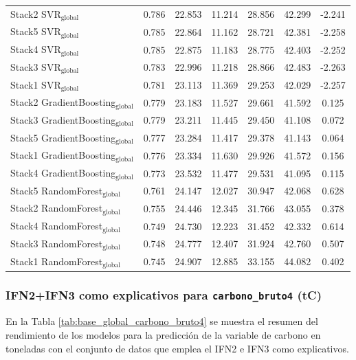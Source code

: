 \begin{table}
{\begin{tabular}{p{4.5cm}cccccc}
    Stack2 SVR$_{\text{global}}$ & 0.786 & 22.853 & 11.214 & 28.856 & 42.299 & -2.241 \\
    Stack5 SVR$_{\text{global}}$ & 0.785 & 22.864 & 11.162 & 28.721 & 42.381 & -2.258 \\
    Stack4 SVR$_{\text{global}}$ & 0.785 & 22.875 & 11.183 & 28.775 & 42.403 & -2.252 \\
    Stack3 SVR$_{\text{global}}$ & 0.783 & 22.996 & 11.218 & 28.866 & 42.483 & -2.263 \\
    Stack1 SVR$_{\text{global}}$ & 0.781 & 23.113 & 11.369 & 29.253 & 42.029 & -2.257 \\
    Stack2 GradientBoosting$_{\text{global}}$ & 0.779 & 23.183 & 11.527 & 29.661 & 41.592 & 0.125 \\
    Stack3 GradientBoosting$_{\text{global}}$ & 0.779 & 23.211 & 11.445 & 29.450 & 41.108 & 0.072 \\
    Stack5 GradientBoosting$_{\text{global}}$ & 0.777 & 23.284 & 11.417 & 29.378 & 41.143 & 0.064 \\
    Stack1 GradientBoosting$_{\text{global}}$ & 0.776 & 23.334 & 11.630 & 29.926 & 41.572 & 0.156 \\
    Stack4 GradientBoosting$_{\text{global}}$ & 0.773 & 23.532 & 11.477 & 29.531 & 41.095 & 0.115 \\
    Stack5 RandomForest$_{\text{global}}$ & 0.761 & 24.147 & 12.027 & 30.947 & 42.068 & 0.628 \\
    Stack2 RandomForest$_{\text{global}}$ & 0.755 & 24.446 & 12.345 & 31.766 & 43.055 & 0.378 \\
    Stack4 RandomForest$_{\text{global}}$ & 0.749 & 24.730 & 12.223 & 31.452 & 42.332 & 0.614 \\
    Stack3 RandomForest$_{\text{global}}$ & 0.748 & 24.777 & 12.407 & 31.924 & 42.760 & 0.507 \\
    Stack1 RandomForest$_{\text{global}}$ & 0.745 & 24.907 & 12.885 & 33.155 & 44.082 & 0.402 \\
            \bottomrule
    \end{tabular}
    }
\end{table}

\subsubsection{IFN2+IFN3 como explicativos para \texttt{carbono\_bruto4} (tC)}


En la Tabla \ref{tab:base_global_carbono_bruto4} se muestra el resumen del rendimiento de los modelos para la predicción de la variable de carbono en toneladas con el conjunto de datos que emplea el IFN2 e IFN3 como explicativos.

